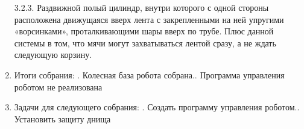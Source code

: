 \documentclass[12pt]{article}
\begin{document}
\begin{enumerate}
	      	3.2.3.	Раздвижной полый цилиндр, внутри которого с одной стороны расположена движущаяся вверх лента с закрепленными на ней упругими «ворсинками», проталкивающими шары вверх по трубе. Плюс данной системы в том, что мячи могут захватываться лентой сразу, а не ждать следующую корзину.
	      	\newline
	      	\item Итоги собрания:
	      	.	Колесная база робота собрана..	Программа управления роботом не реализована
	      	\newline
	      	\item Задачи для следующего собрания:
	      	. Создать программу управления роботом.. Установить защиту днища
	      	\newline	
	      \end{enumerate}
	      \newpage
\end{document}
